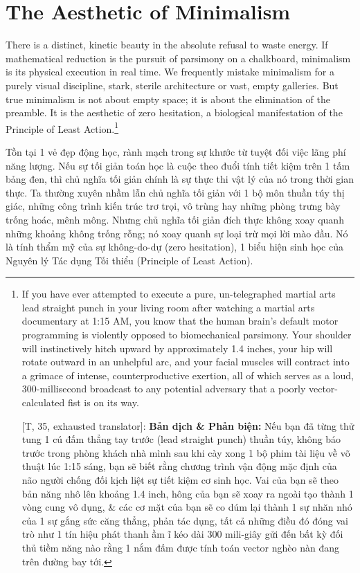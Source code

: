 \documentclass[11pt]{article}
\begin{document}
\section{The Aesthetic of Minimalism}
There is a distinct, kinetic beauty in the absolute refusal to waste energy. If mathematical reduction is the pursuit of parsimony on a chalkboard, minimalism is its physical execution in real time. We frequently mistake minimalism for a purely visual discipline, stark, sterile architecture or vast, empty galleries. But true minimalism is not about empty space; it is about the elimination of the preamble. It is the aesthetic of zero hesitation, a biological manifestation of the Principle of Least Action.\footnote{If you have ever attempted to execute a pure, un-telegraphed martial arts lead straight punch in your living room after watching a martial arts documentary at 1:15 AM, you know that the human brain's default motor programming is violently opposed to biomechanical parsimony. Your shoulder will instinctively hitch upward by approximately 1.4 inches, your hip will rotate outward in an unhelpful arc, and your facial muscles will contract into a grimace of intense, counterproductive exertion, all of which serves as a loud, 300-millisecond broadcast to any potential adversary that a poorly vector-calculated fist is on its way.
	
	\textsf{[T, 35, exhausted translator]:} \textbf{Bản dịch \& Phản biện:} Nếu bạn đã từng thử tung 1 cú đấm thẳng tay trước (lead straight punch) thuần túy, không báo trước trong phòng khách nhà mình sau khi cày xong 1 bộ phim tài liệu về võ thuật lúc 1:15 sáng, bạn sẽ biết rằng chương trình vận động mặc định của não người chống đối kịch liệt sự tiết kiệm cơ sinh học. Vai của bạn sẽ theo bản năng nhô lên khoảng 1.4 inch, hông của bạn sẽ xoay ra ngoài tạo thành 1 vòng cung vô dụng, \& các cơ mặt của bạn sẽ co dúm lại thành 1 sự nhăn nhó của 1 sự gắng sức căng thẳng, phản tác dụng, tất cả những điều đó đóng vai trò như 1 tín hiệu phát thanh ầm ĩ kéo dài 300 mili-giây gửi đến bất kỳ đối thủ tiềm năng nào rằng 1 nắm đấm được tính toán vector nghèo nàn đang trên đường bay tới.}

Tồn tại 1 vẻ đẹp động học, rành mạch trong sự khước từ tuyệt đối việc lãng phí năng lượng. Nếu sự tối giản toán học là cuộc theo đuổi tính tiết kiệm trên 1 tấm bảng đen, thì chủ nghĩa tối giản chính là sự thực thi vật lý của nó trong thời gian thực. Ta thường xuyên nhầm lẫn chủ nghĩa tối giản với 1 bộ môn thuần túy thị giác, những công trình kiến trúc trơ trọi, vô trùng hay những phòng trưng bày trống hoác, mênh mông. Nhưng chủ nghĩa tối giản đích thực không xoay quanh những khoảng không trống rỗng; nó xoay quanh sự loại trừ mọi lời mào đầu. Nó là tính thẩm mỹ của sự không-do-dự (zero hesitation), 1 biểu hiện sinh học của Nguyên lý Tác dụng Tối thiểu (Principle of Least Action).
\end{document}

